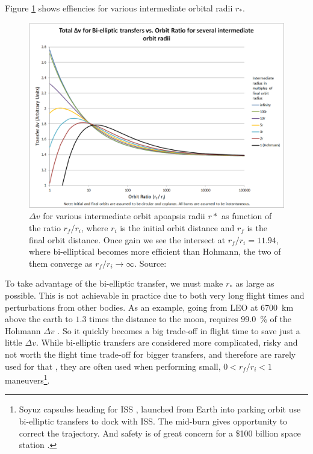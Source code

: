 Figure \ref{fig:hohmann_vs_bi-elliptic2} shows effiencies for various intermediate orbital radii $r_*$.
\begin{figure}[ht]
\centering
\includegraphics[scale=.47]{fig/hohmann_vs_bi-elliptic2.png}
\caption{$\Delta v$ for various intermediate orbit apoapsis radii $r*$ as function of the ratio $r_f/r_i$, where $r_i$ is the initial orbit distance and $r_f$ is the final orbit distance. Once gain we see the intersect at $r_f/r_i = 11.94$, where bi-elliptical becomes more efficient than Hohmann, the two of them converge as $r_f/r_i \to \infty$. Source: \cite{Copperheadtnp}}
\label{fig:hohmann_vs_bi-elliptic2}
\end{figure}
To take advantage of the bi-elliptic transfer, we must make $r_*$ as large as possible. This is not achievable in practice due to both very long flight times and perturbations from other bodies. As an example, going from LEO at \SI{6700}{\km} above the earth to $1.3$ times the distance to the moon, requires \SI{99.0}{\percent} of the Hohmann $\Delta v$ \cite{wiki-bi-elliptic}. So it quickly becomes a big trade-off in flight time to save just a little $\Delta v$. While bi-elliptic transfers are considered more complicated, risky and not worth the flight time trade-off for bigger transfers, and therefore are rarely used for that \cite[p. 78]{Taylor2009}, they are often used when performing small, $0 < r_f/r_i < 1$ maneuvers\footnote{Soyuz capsules heading for ISS \cite{esa-soyuz}, launched from Earth into parking orbit use bi-elliptic transfers to dock with ISS. The mid-burn gives opportunity to correct the trajectory. And safety is of great concern for a \$100 billion space station \cite{iss-worth}.}.


